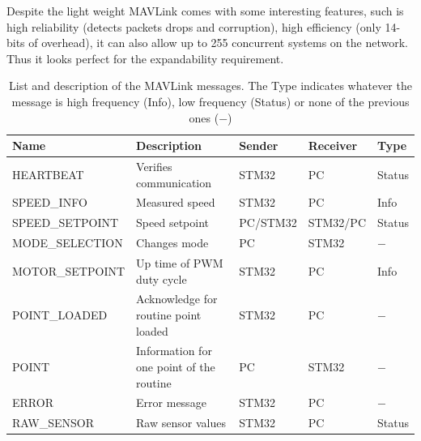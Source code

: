 \documentclass[12pt,a4paper, twoside]{article}
\begin{document}
Despite the light weight MAVLink comes with some interesting features, such is high reliability (detects packets drops and corruption), high efficiency (only 14-bits of overhead), it can also allow up to 255 concurrent systems on the network. Thus it looks perfect for the expandability requirement.

\begin{table}[H]
	\centering
	\begin{tabular}{l||p{3cm}|l|l|l} 
		\textbf{Name} &\textbf{Description} &\textbf{Sender} &\textbf{Receiver} & \textbf{Type}\\ 
		\hline
		\hline 
		HEARTBEAT &Verifies communication& STM32 & PC & Status \\ 
		\hline 
		SPEED\_INFO &Measured speed  & STM32 & PC & Info \\ 
		\hline 
		SPEED\_SETPOINT & Speed setpoint & PC/STM32 & STM32/PC & Status\\ 
		\hline 
		MODE\_SELECTION & Changes mode & PC & STM32 & $-$\\ 
		\hline 
		MOTOR\_SETPOINT & Up time of PWM duty cycle & STM32 & PC & Info  \\ 
		\hline 
		POINT\_LOADED & Acknowledge for routine point loaded  & STM32 & PC & $-$ \\ 
		\hline 
		POINT & Information for one point of the routine  & PC & STM32 & $-$  \\  
		\hline 
		ERROR & Error message & STM32 & PC & $-$  \\
		\hline
		RAW\_SENSOR & Raw sensor values & STM32 & PC & Status\\
	\end{tabular} 
	\caption[MAVLink messages description]{List and description of the MAVLink messages. The Type indicates whatever the message is high frequency (Info), low frequency (Status) or none of the previous ones ($-$)}
	\label{tab:msg}
\end{table}
\end{document}
